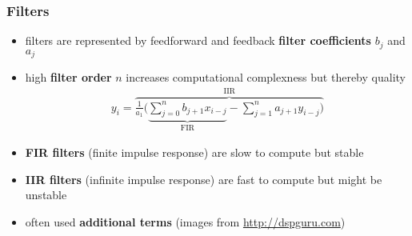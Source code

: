 \begin{frame}
	\frametitle{Filters}
	\begin{itemize}
		\item filters are represented by feedforward and feedback \textbf{filter coefficients} $b_j$ and $a_j$
		\item high \textbf{filter order} $n$ increases computational complexness but thereby quality
			\begin{align*}
				y_i=\overbrace{\frac1{a_1}\Bigg(\underbrace{\sum_{j=0}^nb_{j+1}x_{i-j}}_{\textrm{FIR}}-\sum_{j=1}^na_{j+1}y_{i-j}\Bigg)}^{\textrm{IIR}}
			\end{align*}
		\item \textbf{FIR filters} (finite impulse response) are slow to compute but stable
		\item \textbf{IIR filters} (infinite impulse response) are fast to compute but might be unstable
		\item often used \textbf{additional terms} (images from \url{http://dspguru.com})
			\begin{figure}
				\centering
				\begin{subfigure}[c]{0.48\linewidth}
				\end{subfigure}
				\hspace{0.01\linewidth}
				\begin{subfigure}[c]{0.48\linewidth}
				\end{subfigure}
			\end{figure}
	\end{itemize}
\end{frame}

